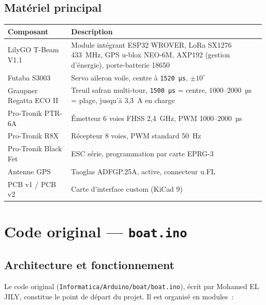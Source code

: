\documentclass[12pt,a4paper]{article}
\newcommand{\us}[1]{\texttt{#1\,µs}}
\newcommand{\file}[1]{\texttt{#1}}
\begin{document}
\subsection{Matériel principal}

\begin{longtable}{L{4cm} L{9cm}}
  \toprule
  \textcolor{tableheadfg}{\textbf{Composant}} &
  \textcolor{tableheadfg}{\textbf{Description}} \\
  \midrule
  \endhead
  \bottomrule
  \endfoot
  LilyGO T-Beam V1.1 & Module intégrant ESP32 WROVER, LoRa SX1276 433~MHz,
                        GPS u-blox NEO-6M, AXP192 (gestion d'énergie),
                        porte-batterie 18650 \\[3pt]
  Futaba S3003 & Servo aileron voile, centre à \us{1520}, $\pm10^{\circ}$ \\[3pt]
  Graupner Regatta ECO II & Treuil safran multi-tour, \us{1500} = centre,
                            1000--2000~µs = plage, jusqu'à 3,3~A en charge \\[3pt]
  Pro-Tronik PTR-6A & Émetteur 6 voies FHSS 2,4~GHz, PWM 1000--2000~µs \\[3pt]
  Pro-Tronik R8X & Récepteur 8 voies, PWM standard 50~Hz \\[3pt]
  Pro-Tronik Black Fet & ESC série, programmation par carte EPRG-3 \\[3pt]
  Antenne GPS & Taoglas ADFGP.25A, active, connecteur u.FL \\[3pt]
  PCB v1 / PCB v2 & Carte d'interface custom (KiCad 9) \\
\end{longtable}

\section{Code original — \texttt{boat.ino}}

\subsection{Architecture et fonctionnement}

Le code original (\file{Informatica/Arduino/boat/boat.ino}), écrit par Mohamed
EL JILY, constitue le point de départ du projet. Il est organisé en modules~:
\end{document}

